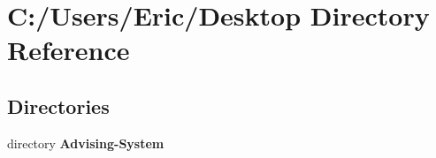 \section{C\+:/\+Users/\+Eric/\+Desktop Directory Reference}
\label{dir_01519ffa3e40bb5ebff26749f59d2f3d}
\subsection*{Directories}
\begin{DoxyCompactItemize}
\item 
directory {\bf Advising-\/\+System}
\end{DoxyCompactItemize}
